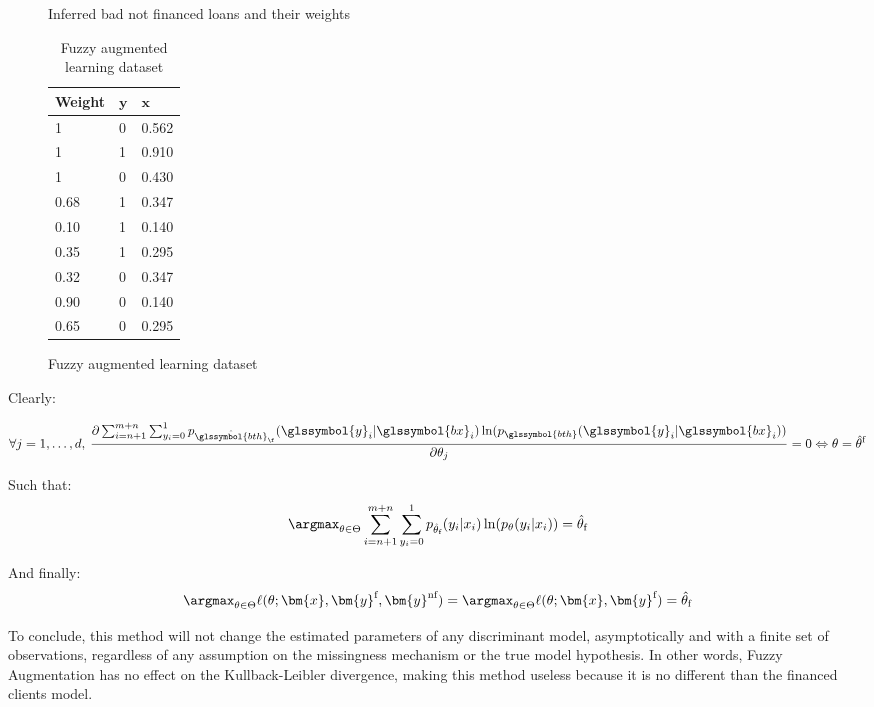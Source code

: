 \begin{table}
{\begin{multicols}{4}
\begin{subfigure}[t]{0.22\textwidth}
\caption{Inferred bad not financed loans and their weights}
\label{fuzzy:sfig3}
\end{subfigure}

\columnbreak

\begin{subfigure}[t]{0.22\textwidth}
\begin{center}
\begin{adjustbox}{max width=0.95\textwidth}
\begin{tabular}{l l l}
\toprule
\textbf{Weight} & \textbf{${\bm{y}}$} & \textbf{${\bm{x}}$}\\
\midrule
1 & 0 & 0.562 \\
1 & 1 & 0.910 \\
1 & 0 & 0.430 \\
0.68 & 1 & 0.347 \\
0.10 & 1 & 0.140 \\
0.35 & 1 & 0.295 \\
0.32 & 0 & 0.347 \\
0.90 & 0 & 0.140 \\
0.65 & 0 & 0.295 \\
\bottomrule
\end{tabular}
\end{adjustbox}
\end{center}
\caption{Fuzzy augmented learning dataset}
\label{fuzzy:sfig4}
\end{subfigure}

\end{multicols}
}
\end{table}

 Clearly:

 \[ \forall j = 1, \ldots, d, \: \frac{\partial \sum_{i=n+1}^{m+n} \sum_{y_i = 0}^{1} p_{\hat{\glssymbol{bth}}_\f}(\glssymbol{y}_i| \glssymbol{bx}_i)\ln (p_{\glssymbol{bth}}(\glssymbol{y}_i| \glssymbol{bx}_i))}{\partial \theta_j} = 0 \Leftrightarrow \theta = \hat{\theta}^{\text{f}} \]

 Such that:
 \[\argmax_{\theta \in \Theta}  \sum_{i=n+1}^{m+n} \sum_{y_i = 0}^{1} p_{\hat{\theta}_{\text{f}}}(y_i| x_i)\ln (p_\theta(y_i| x_i)) = \hat{\theta}_{\text{f}}\]

 And finally:
 \[\argmax_{\theta \in \Theta} \ell(\theta;{\bm{x}},{\bm{y}}^{\text{f}},{\bm{y}}^{\text{nf}}) = \argmax_{\theta \in \Theta} \ell(\theta;{\bm{x}},{\bm{y}}^{\text{f}}) = \hat{\theta}_{\text{f}}\]

 To conclude, this method will not change the estimated parameters of any discriminant model, asymptotically and with a finite set of observations, regardless of any assumption on the missingness mechanism or the true model hypothesis. In other words, Fuzzy Augmentation has no effect on the Kullback-Leibler divergence, making this method useless because it is no different than the financed clients model.


